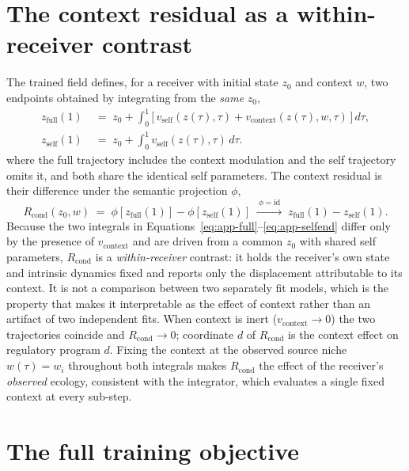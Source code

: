 \section{The context residual as a within-receiver contrast}

The trained field defines, for a receiver with initial state $z_0$ and context $w$, two endpoints
obtained by integrating from the \emph{same} $z_0$,
\begin{align}
z_{\mathrm{full}}(1) \;&=\; z_0 + \int_0^1 \bigl[\, v_{\mathrm{self}}(z(\tau), \tau)
   + v_{\mathrm{context}}(z(\tau), w, \tau) \,\bigr]\, d\tau , \label{eq:app-full}\\
z_{\mathrm{self}}(1) \;&=\; z_0 + \int_0^1 v_{\mathrm{self}}(z(\tau), \tau)\, d\tau . \label{eq:app-selfend}
\end{align}
where the full trajectory includes the context modulation and the self trajectory omits it, and both
share the identical self parameters. The context residual is their difference under the semantic
projection $\phi$,
\begin{equation}\label{eq:app-rcond}
R_{\mathrm{cond}}(z_0, w) \;=\; \phi\!\left[z_{\mathrm{full}}(1)\right] - \phi\!\left[z_{\mathrm{self}}(1)\right]
\;\xrightarrow{\ \phi=\mathrm{id}\ }\;
z_{\mathrm{full}}(1) - z_{\mathrm{self}}(1) .
\end{equation}
Because the two integrals in Equations~\ref{eq:app-full}--\ref{eq:app-selfend} differ only by the
presence of $v_{\mathrm{context}}$ and are driven from a common $z_0$ with shared self parameters,
$R_{\mathrm{cond}}$ is a \emph{within-receiver} contrast: it holds the receiver's own state and intrinsic
dynamics fixed and reports only the displacement attributable to its context. It is not a comparison
between two separately fit models, which is the property that makes it interpretable as the effect of
context rather than an artifact of two independent fits. When context is inert
($v_{\mathrm{context}} \to 0$) the two trajectories coincide and $R_{\mathrm{cond}} \to 0$; coordinate
$d$ of $R_{\mathrm{cond}}$ is the context effect on regulatory program $d$. Fixing the context at the
observed source niche $w(\tau) = w_i$ throughout both integrals makes $R_{\mathrm{cond}}$ the effect of
the receiver's \emph{observed} ecology, consistent with the integrator, which evaluates a single fixed
context at every sub-step.

\section{The full training objective}

